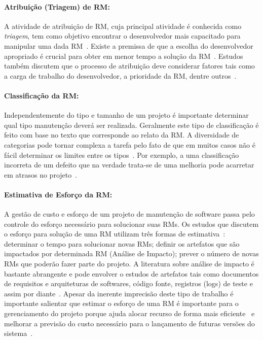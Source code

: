 \paragraph{Atribuição (Triagem) de RM:}

A atividade de atribuição de RM, cuja principal atividade é conhecida como
\textit{triagem}, tem como objetivo encontrar o desenvolvedor mais capacitado
para manipular uma dada RM~\cite{cavalcanti2014challenges}. Existe a premissa de
que a escolha do desenvolvedor apropriado é crucial para obter em menor tempo a
so\-lu\-ção da RM~\cite{di2002approach}. Estudos também discutem que o processo
de atribuição deve considerar fatores tais como a carga de trabalho do
desenvolvedor, a prioridade da RM, dentre outros~\cite{aljarah2011selecting}.

\paragraph{Classificação da RM:}

Independentemente do tipo e tamanho de um projeto é importante determinar qual
tipo manutenção deverá ser realizada. Geralmente este tipo de classificação é
feito com base no texto que corresponde ao relato da RM\@. A diversidade de
categorias pode tornar complexa a tarefa pelo fato de que em muitos casos não é
fácil determinar os limites entre os tipos~\cite{antoniol2008bug}. Por exemplo,
a uma classificação incorreta de um defeito que na verdade trata-se de uma
melhoria pode acarretar em atrasos no projeto~\cite{cavalcanti2014challenges}.

\paragraph{Estimativa de Esforço da RM:}

A gestão de custo e esforço de um projeto de manutenção de software passa pelo
controle do esforço necessário para solucionar suas RMs. Os estudos que discutem
o esforço para solução de uma RM  utilizam três formas de
estimativa~\cite{cavalcanti2014challenges}: determinar o tempo para solucionar
novas RMs; definir os artefatos que são impactados por determinada RM (Análise
de Impacto); prever o número de novas RMs que poderão fazer parte do projeto. A
literatura sobre análise de impacto é bastante abrangente e pode envolver o
estudos de artefatos tais como documentos de requisitos e arquiteturas de
softwares, código fonte, registros (logs) de teste e assim por
diante~\cite{cavalcanti2014challenges}.  Apesar da inerente imprecisão deste
tipo de trabalho é importante salientar que estimar o esforço de uma RM é
importante para o gerenciamento do projeto porque ajuda alocar recurso de forma
mais eficiente~\cite{Bhattacharya:2011:BTP:1985441.1985472} e melhorar a
previsão do custo necessário para o lançamento de futuras versões do
sistema~\cite{Vijayakumar2014}.

